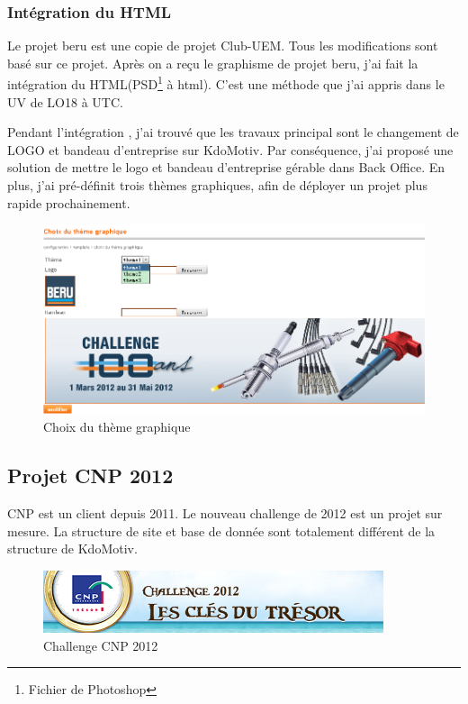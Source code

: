 \subsubsection{Intégration du HTML}
Le projet beru est une copie de projet Club-UEM. Tous les modifications sont basé sur ce projet. Après on a reçu le graphisme de projet beru, j'ai fait la intégration du HTML(PSD\footnote{Fichier de Photoshop} à html). C'est une  méthode que j'ai appris dans le UV de LO18 à UTC.  

Pendant l'intégration , j'ai trouvé que les travaux principal sont le changement de LOGO et bandeau d'entreprise sur KdoMotiv. Par conséquence, j'ai proposé une solution de mettre le logo et bandeau d'entreprise gérable dans Back Office. En plus, j'ai pré-définit trois thèmes graphiques, afin de déployer un projet plus rapide prochainement.

\begin{figure}[hbtp]
\centering
\includegraphics[width=16cm]{body/images/template-theme.png}
\caption{Choix du thème graphique}
\end{figure}
 


\subsection{Projet CNP 2012}
CNP est un client depuis 2011. Le nouveau challenge de 2012 est un projet sur mesure. La structure de site et base de donnée sont totalement différent de la structure de KdoMotiv.

\begin{figure}[hbtp]
\centering
\includegraphics[width=10cm]{body/images/cnp-2012.png}
\caption{Challenge CNP 2012}
\end{figure}

